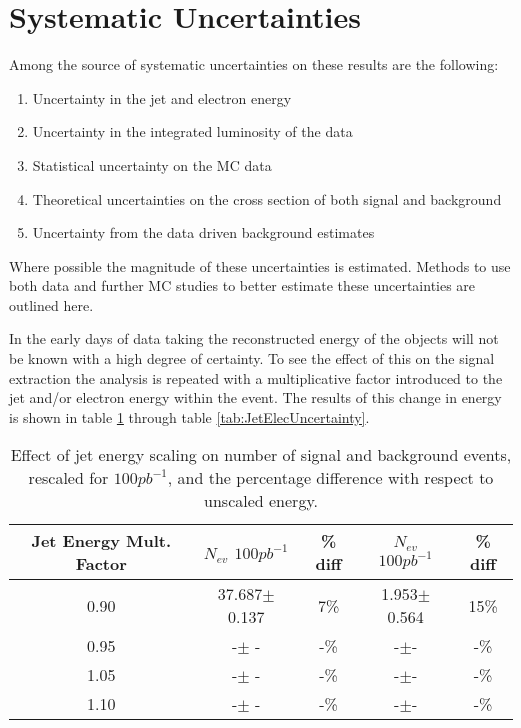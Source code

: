 \documentclass{cmspaper}
\begin{document}
\section{Systematic Uncertainties} \label{sec:Systematics}

Among the source of systematic uncertainties on these results are the following:
%
\begin{enumerate}
\item Uncertainty in the jet and electron energy 
\item Uncertainty in the integrated luminosity of the data
\item Statistical uncertainty on the MC data
\item Theoretical uncertainties on the cross section of both signal and background
\item Uncertainty from the data driven background estimates
\end{enumerate}
%
Where possible the magnitude of these uncertainties is estimated.   Methods to use both data and further MC studies to better estimate these uncertainties are outlined here.

In the early days of data taking the reconstructed energy of the objects will not be known with a high degree of certainty.  To see the effect of this on the signal extraction the analysis 
is repeated with a multiplicative factor introduced to the jet and/or electron energy within the event.  The results of this change in energy is shown in table \ref{tab:JetUncertainty} 
through table  \ref{tab:JetElecUncertainty}. 

\begin{table}[htbp]
\begin{center}
\begin{tabular}{|c|c|c|c|c|}
\hline
\hline
Jet Energy Mult. Factor & $N_{ev}$ $100pb^{-1}$ & \% diff & $N_{ev}$ $100pb^{-1}$ & \% diff  \\
\hline
\hline
0.90 & 37.687$\pm$ 0.137& 7\% &1.953$\pm$0.564& 15\% \\
\hline
0.95 & -$\pm$ -& -\% &-$\pm$-& -\% \\
\hline
1.05 & -$\pm$ -& -\% &-$\pm$-&-\% \\
\hline
1.10 & -$\pm$ -& -\% &-$\pm$-& -\% \\
\hline

\hline
\end{tabular}
\end{center}
\caption{Effect of jet energy scaling on number of signal and background events, rescaled for $100 pb^{-1}$, and the percentage difference with respect to unscaled energy.}
\label{tab:JetUncertainty}
\end{table}
\end{document}
